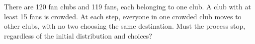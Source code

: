 There are 120 fan clubs and 119 fans, each belonging to one club. A club with at least 15 fans is crowded. At each step, everyone in one crowded club moves to other clubs, with no two choosing the same destination. Must the process stop, regardless of the initial distribution and choices?
